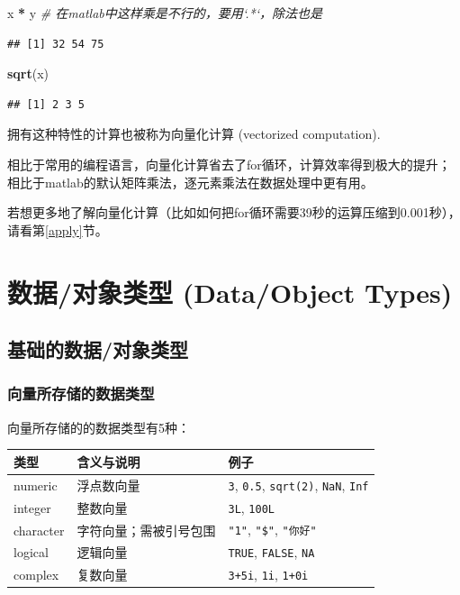 \documentclass[]{book}
\newenvironment{Shaded}{\begin{snugshade}}{\end{snugshade}}
\newcommand{\CommentTok}[1]{\textcolor[rgb]{0.56,0.35,0.01}{\textit{#1}}}
\newcommand{\KeywordTok}[1]{\textcolor[rgb]{0.13,0.29,0.53}{\textbf{#1}}}
\newcommand{\NormalTok}[1]{#1}
\newcommand{\OperatorTok}[1]{\textcolor[rgb]{0.81,0.36,0.00}{\textbf{#1}}}
\newcommand{\StringTok}[1]{\textcolor[rgb]{0.31,0.60,0.02}{#1}}
\begin{document}
\begin{Shaded}
\begin{Highlighting}[]
\NormalTok{x }\OperatorTok{*}\StringTok{ }\NormalTok{y }\CommentTok{# 在matlab中这样乘是不行的，要用`.*`，除法也是}
\end{Highlighting}
\end{Shaded}

\begin{verbatim}
## [1] 32 54 75
\end{verbatim}

\begin{Shaded}
\begin{Highlighting}[]
\KeywordTok{sqrt}\NormalTok{(x)}
\end{Highlighting}
\end{Shaded}

\begin{verbatim}
## [1] 2 3 5
\end{verbatim}

拥有这种特性的计算也被称为向量化计算 (vectorized computation).

相比于常用的编程语言，向量化计算省去了for循环，计算效率得到极大的提升；相比于matlab的默认矩阵乘法，逐元素乘法在数据处理中更有用。

若想更多地了解向量化计算（比如如何把for循环需要39秒的运算压缩到0.001秒），请看第\ref{apply}节。

\hypertarget{data-types}{%
\section{数据/对象类型 (Data/Object Types)}\label{data-types}}

\hypertarget{data-types-basics}{%
\subsection{基础的数据/对象类型}\label{data-types-basics}}

\hypertarget{data-types-vector}{%
\subsubsection{向量所存储的数据类型}\label{data-types-vector}}

向量所存储的的数据类型有5种：

\begin{longtable}[]{@{}lll@{}}
\toprule
类型 & 含义与说明 & 例子\tabularnewline
\midrule
\endhead
numeric & 浮点数向量 & \texttt{3}, \texttt{0.5}, \texttt{sqrt(2)}, \texttt{NaN}, \texttt{Inf}\tabularnewline
integer & 整数向量 & \texttt{3L}, \texttt{100L}\tabularnewline
character & 字符向量；需被引号包围 & \texttt{"1"}, \texttt{"\$"}, \texttt{"你好"}\tabularnewline
logical & 逻辑向量 & \texttt{TRUE}, \texttt{FALSE}, \texttt{NA}\tabularnewline
complex & 复数向量 & \texttt{3+5i}, \texttt{1i}, \texttt{1+0i}\tabularnewline
\bottomrule
\end{longtable}
\end{document}

